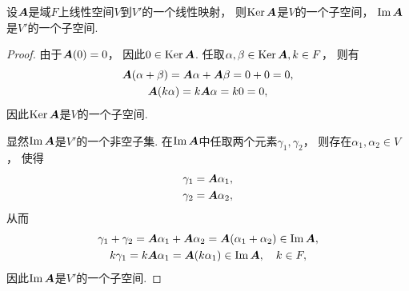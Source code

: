 \begin{proposition}\label{theorem:线性映射.线性映射的核空间和像空间分别是定义域和陪域的子空间}
设\(\boldsymbol{A}\)是域\(F\)上线性空间\(V\)到\(V'\)的一个线性映射，
则\(\operatorname{Ker}\boldsymbol{A}\)是\(V\)的一个子空间，
\(\Im\boldsymbol{A}\)是\(V'\)的一个子空间.
\begin{proof}
由于\(\boldsymbol{A}(0)=0\)，
因此\(0 \in \operatorname{Ker}\boldsymbol{A}\).
任取\(\alpha,\beta \in \operatorname{Ker}\boldsymbol{A},
k \in F\)，
则有\begin{gather*}
	\boldsymbol{A}(\alpha+\beta)
	= \boldsymbol{A}\alpha + \boldsymbol{A}\beta
	= 0 + 0
	= 0, \\
	\boldsymbol{A}(k\alpha)
	= k \boldsymbol{A}\alpha
	= k0
	= 0,
\end{gather*}
因此\(\operatorname{Ker}\boldsymbol{A}\)是\(V\)的一个子空间.

显然\(\Im\boldsymbol{A}\)是\(V'\)的一个非空子集.
在\(\Im\boldsymbol{A}\)中任取两个元素\(\gamma_1,\gamma_2\)，
则存在\(\alpha_1,\alpha_2 \in V\)，
使得\begin{gather*}
	\gamma_1 = \boldsymbol{A}\alpha_1, \\
	\gamma_2 = \boldsymbol{A}\alpha_2,
\end{gather*}
从而\begin{gather*}
	\gamma_1 + \gamma_2
	= \boldsymbol{A}\alpha_1 + \boldsymbol{A}\alpha_2
	= \boldsymbol{A}(\alpha_1 + \alpha_2)
	\in \Im\boldsymbol{A}, \\
	k \gamma_1
	= k \boldsymbol{A}\alpha_1
	= \boldsymbol{A}(k \alpha_1)
	\in \Im\boldsymbol{A},
	\quad k \in F,
\end{gather*}
因此\(\Im\boldsymbol{A}\)是\(V'\)的一个子空间.
\end{proof}
\end{proposition}

